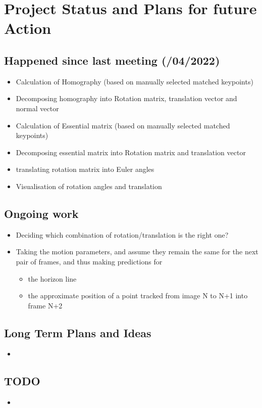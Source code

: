 \chapter{Project Status and Plans for future Action}

\section{Happened since last meeting (/04/2022)}
\begin{itemize}
    \item Calculation of Homography (based on manually selected matched keypoints)
    \item Decomposing homography into Rotation matrix, translation vector and normal vector
    \item Calculation of Essential matrix (based on manually selected matched keypoints)
    \item Decomposing essential matrix into Rotation matrix and translation vector
    \item translating rotation matrix into Euler angles
    \item Visualisation of rotation angles and translation
\end{itemize}

\section{Ongoing work}
\begin{itemize}
    \item Deciding which combination of rotation/translation is the right one?
    \item Taking the motion parameters, and assume they remain the same for the next pair of frames, and thus making predictions for
    \begin{itemize}
        \item the horizon line
        \item the approximate position of a point tracked from image N to N+1 into frame N+2
    \end{itemize}
\end{itemize}

\section{Long Term Plans and Ideas}
\begin{itemize}
    \item 
\end{itemize}

\section{TODO}
\begin{itemize}
    \item 
\end{itemize}